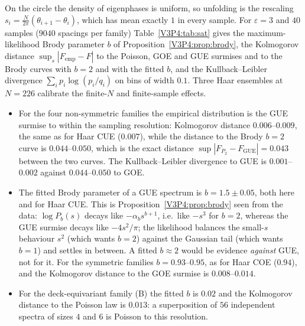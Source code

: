 \begin{remark}\label{V3P4:rem:brodyfit}
On the circle the density of eigenphases is uniform, so unfolding is the rescaling
$s_i=\frac N{2\pi}(\theta_{i+1}-\theta_i)$, which has mean exactly $1$ in every sample. For
$\varepsilon=3$ and $40$ samples ($9040$ spacings per family) Table~\ref{V3P4:tab:sat} gives the
maximum-likelihood Brody parameter $b$ of Proposition~\ref{V3P4:prop:brody}, the Kolmogorov
distance $\sup_s|F_{\mathrm{emp}}-F|$ to the Poisson, GOE and GUE surmises and to the Brody
curves with $b=2$ and with the fitted $b$, and the Kullback--Leibler divergence
$\sum_ip_i\log(p_i/q_i)$ on bins of width $0.1$. Three Haar ensembles at $N=226$ calibrate the
finite-$N$ and finite-sample effects.
\begin{itemize}
\item[(1)] For the four non-symmetric families the empirical distribution is the GUE surmise to
within the sampling resolution: Kolmogorov distance $0.006$--$0.009$, the same as for Haar CUE
($0.007$), while the distance to the Brody $b=2$ curve is $0.044$--$0.050$, which is the exact
distance $\sup|F_{P_2}-F_{\mathrm{GUE}}|=0.043$ between the two curves. The Kullback--Leibler
divergence to GUE is $0.001$--$0.002$ against $0.044$--$0.050$ to GOE.
\item[(2)] The fitted Brody parameter of a GUE spectrum is $b=1.5\pm0.05$, both here and for Haar
CUE. This is Proposition~\ref{V3P4:prop:brody} seen from the data: $\log P_b(s)$ decays like
$-\alpha_bs^{b+1}$, i.e.\ like $-s^{3}$ for $b=2$, whereas the GUE surmise decays like
$-4s^{2}/\pi$; the likelihood balances the small-$s$ behaviour $s^{2}$ (which wants $b=2$) against
the Gaussian tail (which wants $b=1$) and settles in between. A fitted $b\approx2$ would be
evidence \emph{against} GUE, not for it. For the symmetric families $b=0.93$--$0.95$, as for Haar
COE ($0.94$), and the Kolmogorov distance to the GOE surmise is $0.008$--$0.014$.
\item[(3)] For the deck-equivariant family (B) the fitted $b$ is $0.02$ and the Kolmogorov
distance to the Poisson law is $0.013$: a superposition of $56$ independent spectra of sizes $4$
and $6$ is Poisson to this resolution.
\end{itemize}
\end{remark}

